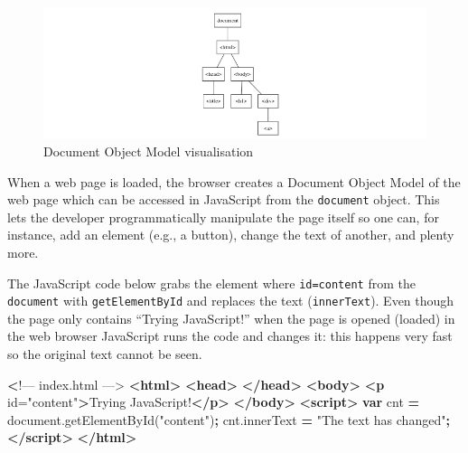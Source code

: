 \documentclass[
  10pt,
]{krantz}
\makeatletter
\newenvironment{Shaded}{\begin{snugshade}}{\end{snugshade}}
\newcommand{\AttributeTok}[1]{\textcolor[rgb]{0.61,0.61,0.61}{#1}}
\newcommand{\ErrorTok}[1]{\textcolor[rgb]{0.14,0.14,0.14}{\textbf{#1}}}
\newcommand{\KeywordTok}[1]{\textcolor[rgb]{0.27,0.27,0.27}{\textbf{#1}}}
\newcommand{\NormalTok}[1]{#1}
\newcommand{\OperatorTok}[1]{\textcolor[rgb]{0.43,0.43,0.43}{\textbf{#1}}}
\newcommand{\OtherTok}[1]{\textcolor[rgb]{0.37,0.37,0.37}{#1}}
\newcommand{\StringTok}[1]{\textcolor[rgb]{0.5,0.5,0.5}{#1}}
\newcommand{\VariableTok}[1]{\textcolor[rgb]{0,0,0}{#1}}
\newenvironment{kframe}{%
\medskip{}
\setlength{\fboxsep}{.8em}
 \def\at@end@of@kframe{}%
 \ifinner\ifhmode%
  \def\at@end@of@kframe{\end{minipage}}%
  \begin{minipage}{\columnwidth}%
 \fi\fi%
 \def\FrameCommand##1{\hskip\@totalleftmargin \hskip-\fboxsep
 \colorbox{shadecolor}{##1}\hskip-\fboxsep
     \hskip-\linewidth \hskip-\@totalleftmargin \hskip\columnwidth}%
 \MakeFramed {\advance\hsize-\width
   \@totalleftmargin\z@ \linewidth\hsize
   \@setminipage}}%
 {\par\unskip\endMakeFramed%
 \at@end@of@kframe}
\renewenvironment{Shaded}{\begin{kframe}}{\end{kframe}}
\makeatother
\begin{document}
\begin{figure}[H]

{\centering \includegraphics[width=1\linewidth]{images/02-dom-viz} 

}

\caption{Document Object Model visualisation}\label{fig:dom-viz}
\end{figure}

When a web page is loaded, the browser creates a Document Object Model of the web page which can be accessed in JavaScript from the \texttt{document} object. This lets the developer programmatically manipulate the page itself so one can, for instance, add an element (e.g., a button), change the text of another, and plenty more.

The JavaScript code below grabs the element where \texttt{id=\textquotesingle{}content\textquotesingle{}} from the \texttt{document} with \texttt{getElementById} and replaces the text (\texttt{innerText}). Even though the page only contains ``Trying JavaScript!'' when the page is opened (loaded) in the web browser JavaScript runs the code and changes it: this happens very fast so the original text cannot be seen.

\begin{Shaded}
\begin{Highlighting}[]
 \ErrorTok{<}\NormalTok{!–– index.html ––>}
\KeywordTok{<html>}
  \KeywordTok{<head>}
  \KeywordTok{</head>}
  \KeywordTok{<body>}
    \KeywordTok{<p}\OtherTok{ id=}\StringTok{"content"}\KeywordTok{>}\NormalTok{Trying JavaScript!}\KeywordTok{</p>}
  \KeywordTok{</body>}
  \KeywordTok{<script>}
    \KeywordTok{var}\NormalTok{ cnt }\OperatorTok{=} \VariableTok{document}\NormalTok{.}\AttributeTok{getElementById}\NormalTok{(}\StringTok{"content"}\NormalTok{)}\OperatorTok{;}
    \VariableTok{cnt}\NormalTok{.}\AttributeTok{innerText} \OperatorTok{=} \StringTok{"The text has changed"}\OperatorTok{;}
  \KeywordTok{</script>}
\KeywordTok{</html>}
\end{Highlighting}
\end{Shaded}
\end{document}
